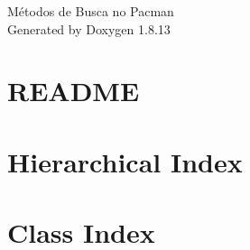 \documentclass[twoside]{book}
\newcommand{\+}{\discretionary{\mbox{\scriptsize$\hookleftarrow$}}{}{}}
\newcommand{\clearemptydoublepage}{%
  \newpage{\pagestyle{empty}\cleardoublepage}%
}
\begin{document}
\hypersetup{pageanchor=false,
             bookmarksnumbered=true,
             pdfencoding=unicode
            }
\begin{titlepage}
\vspace*{7cm}
\begin{center}%
{\Large Métodos de Busca no Pacman }\\
\vspace*{1cm}
{\large Generated by Doxygen 1.8.13}\\
\end{center}
\end{titlepage}
\clearemptydoublepage
{}
\tableofcontents
\clearemptydoublepage
{}
\hypersetup{pageanchor=true}

\chapter{R\+E\+A\+D\+ME}
\label{md__r_e_a_d_m_e}

\chapter{Hierarchical Index}

\chapter{Class Index}

\end{document}
